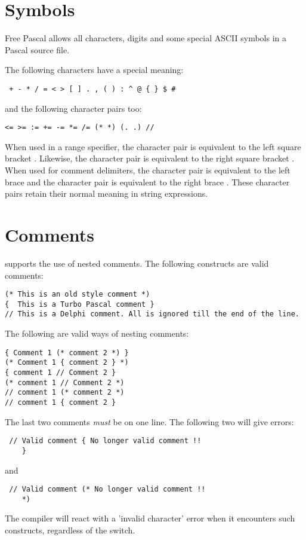 \section{Symbols}
Free Pascal allows all characters, digits and some special ASCII symbols
in a Pascal source file.

The following characters have a special meaning:
\begin{verbatim}
 + - * / = < > [ ] . , ( ) : ^ @ { } $ #
\end{verbatim}
and the following character pairs too:
\begin{verbatim}
<= >= := += -= *= /= (* *) (. .) //
\end{verbatim}
When used in a range specifier, the character pair  is equivalent to
the left square bracket \var{[}. Likewise, the character pair  is
equivalent to the right square bracket \var{]}.
When used for comment delimiters, the character pair \var{(*} is equivalent
to the  left brace \var{\{} and the character pair \var{*)} is equivalent
to the right brace \var{\}}.
These character pairs retain their normal meaning in string expressions.


\section{Comments}
\fpc supports the use of nested comments. The following constructs are valid
comments:
\begin{verbatim}
(* This is an old style comment *)
{  This is a Turbo Pascal comment }
// This is a Delphi comment. All is ignored till the end of the line.
\end{verbatim}
The following are valid ways of nesting comments:
\begin{verbatim}
{ Comment 1 (* comment 2 *) }
(* Comment 1 { comment 2 } *)
{ comment 1 // Comment 2 }
(* comment 1 // Comment 2 *)
// comment 1 (* comment 2 *)
// comment 1 { comment 2 }
\end{verbatim}
The last two comments {\em must} be on one line. The following two will give
errors:
\begin{verbatim}
 // Valid comment { No longer valid comment !!
    }
\end{verbatim}
and
\begin{verbatim}
 // Valid comment (* No longer valid comment !!
    *)
\end{verbatim}
The compiler will react with a 'invalid character' error when it encounters
such constructs, regardless of the  switch.

